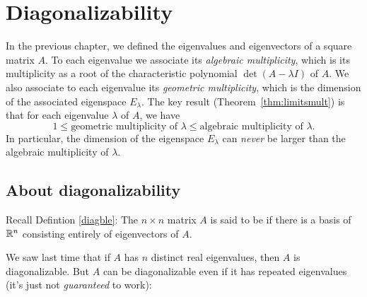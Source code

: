 \chapter{Diagonalizability}
\label{chapter:23Diag}
 


In the previous chapter, we defined the eigenvalues and eigenvectors of a square matrix $A$.  To each eigenvalue we associate its \emph{algebraic multiplicity}, which is its multiplicity as a root of the characteristic polynomial $\det(A-\lambda I)$ of $A$.  We also associate to each eigenvalue its \emph{geometric multiplicity}, which is the dimension of the associated eigenspace $E_\lambda$.  The key result (Theorem~\ref{thm:limitsmult}) is that for each eigenvalue $\lambda$ of $A$, we have
$$
1 \leq \text{geometric multiplicity of $\lambda$} \leq
\text{algebraic multiplicity of $\lambda$}.
$$
In particular, the dimension of the eigenspace $E_\lambda$ can \emph{never} be larger than the algebraic multiplicity of $\lambda$.
 
\section{About diagonalizability}\label{section:diag}

Recall Defintion \ref{diagble}:
The $n\times n$ matrix $A$ is said to be  if there
is a basis of $\mathbb{R}^n$ consisting entirely of eigenvectors of $A$.
 

We saw last time that if $A$ has $n$ distinct real eigenvalues,
then $A$ is diagonalizable.  But $A$ can be diagonalizable even
if it has repeated eigenvalues (it's just not {\it guaranteed} to work):

